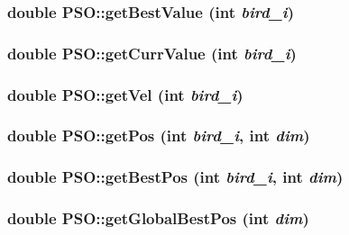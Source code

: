 \hypertarget{classPSO_f1b0098355740260c05223e08d5ed677}{
\subsubsection{\setlength{\rightskip}{0pt plus 5cm}double PSO::getBestValue (int {\em bird\_\-i})}}
\label{classPSO_f1b0098355740260c05223e08d5ed677}


\hypertarget{classPSO_d8d4aebf8fbdafe174bb58fc013b565e}{
\subsubsection{\setlength{\rightskip}{0pt plus 5cm}double PSO::getCurrValue (int {\em bird\_\-i})}}
\label{classPSO_d8d4aebf8fbdafe174bb58fc013b565e}


\hypertarget{classPSO_196c4f05616dce8974e8033d8ddbf799}{
\subsubsection{\setlength{\rightskip}{0pt plus 5cm}double PSO::getVel (int {\em bird\_\-i})}}
\label{classPSO_196c4f05616dce8974e8033d8ddbf799}


\hypertarget{classPSO_1bfc5f45a50fa13a8d11231ca522095a}{
\subsubsection{\setlength{\rightskip}{0pt plus 5cm}double PSO::getPos (int {\em bird\_\-i}, \/  int {\em dim})}}
\label{classPSO_1bfc5f45a50fa13a8d11231ca522095a}


\hypertarget{classPSO_7550f99f2e4bb038843e6cfbfebc6c11}{
\subsubsection{\setlength{\rightskip}{0pt plus 5cm}double PSO::getBestPos (int {\em bird\_\-i}, \/  int {\em dim})}}
\label{classPSO_7550f99f2e4bb038843e6cfbfebc6c11}


\hypertarget{classPSO_069d1e4640bc7be42e7d977d65365240}{
\subsubsection{\setlength{\rightskip}{0pt plus 5cm}double PSO::getGlobalBestPos (int {\em dim})}}
\label{classPSO_069d1e4640bc7be42e7d977d65365240}


